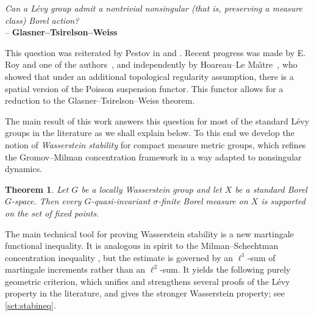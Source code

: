 \documentclass{amsart}
\numberwithin{equation}{subsection}
\theoremstyle{plain}
\newtheorem{mainthm}{Theorem}
\theoremstyle{definition}
\theoremstyle{plain}
\begin{document}
\smallskip

\begin{center}
\begin{minipage}{0.94\textwidth}
    \emph{Can a L\'{e}vy group admit a nontrivial nonsingular (that is, preserving a measure class) Borel action?}\\
    \hfill -- {\footnotesize\bfseries Glasner--Tsirelson--Weiss
    \cite[Question 1.2]{glasner2005automorphism}}
\end{minipage}
\end{center}

\smallskip

This question was reiterated by Pestov in \cite[Open Problem~7.1.19]{Pestov2006} and \cite[Question~21]{pestov2007forty}. Recent progress was made by E. Roy and one of the authors~\cite[Thm.~5]{avraham2025poissonian}, and independently by Hoareau--Le Ma{\^\i}tre~\cite[Thm.~E]{hoareau2026}, who showed that under an additional topological regularity assumption, there is a spatial version of the Poisson suspension functor. This functor allows for a reduction to the Glasner--Tsirelson--Weiss theorem.

\smallskip

The main result of this work answers this question for most of the standard L\'{e}vy groups in the literature \cite{glasner2005automorphism,Pestov2006,giordano2007some} as we shall explain below. To this end we develop the notion of \emph{Wasserstein stability} for compact measure metric groups, which refines the Gromov--Milman concentration framework in a way adapted to nonsingular dynamics.

\begin{mainthm}\label{mthm1}
Let \(G\) be a locally Wasserstein group and let \(X\) be a standard Borel \(G\)-space. Then every \(G\)-quasi-invariant \(\sigma\)-finite Borel measure on \(X\) is supported on the set of fixed points.
\end{mainthm}

The main technical tool for proving Wasserstein stability is a new martingale functional inequality. It is analogous in spirit to the Milman--Schechtman concentration inequality \cite[I, Thm.~7.12]{milman1986asymptotic}, but the estimate is governed by an \(\ell^{1}\)-sum of martingale increments rather than an \(\ell^{2}\)-sum. It yields the following purely geometric criterion, which unifies and strengthens several proofs of the L\'{e}vy property in the literature, and gives the stronger Wasserstein property; see \cref{sct:stabineq}.
\end{document}
